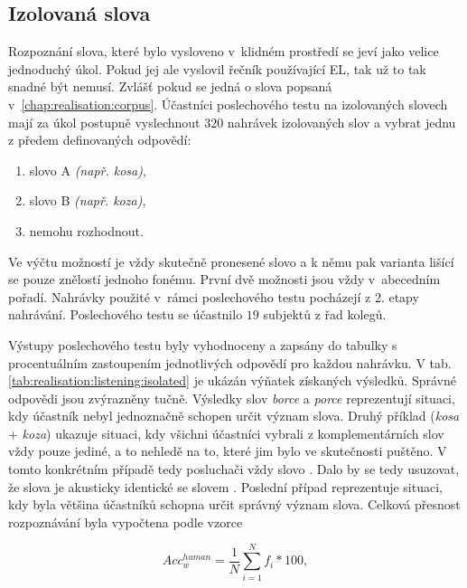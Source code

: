 \subsection{Izolovaná slova}
\label{chap:realisation:listening:isolated}

Rozpoznání slova, které bylo vysloveno v~klidném prostředí se jeví jako velice jednoduchý úkol.
Pokud jej ale vyslovil řečník používající EL, tak už to tak snadné být nemusí.
Zvlášť pokud se jedná o slova popsaná v~\ref{chap:realisation:corpus}.
Účastníci poslechového testu na izolovaných slovech mají za úkol postupně vyslechnout $320$ nahrávek izolovaných slov a vybrat jednu z předem definovaných odpovědí:

\begin{enumerate}[label=\alph*)]
  \item slovo A \textit{(např. kosa)},
  \item slovo B \textit{(např. koza)},
  \item nemohu rozhodnout.
\end{enumerate}

\noindent Ve výčtu možností je vždy skutečně pronesené slovo a k němu pak varianta lišící se pouze znělostí jednoho fonému. První dvě možnosti jsou vždy v~abecedním pořadí. Nahrávky použité v~rámci poslechového testu pocházejí z 2. etapy nahrávání. Poslechového testu se účastnilo $19$ subjektů z řad kolegů.

Výstupy poslechového testu byly vyhodnoceny a zapsány do tabulky s procentuálním zastoupením jednotlivých odpovědí pro každou nahrávku.
V tab. \ref{tab:realisation:listening:isolated} je ukázán výňatek získaných výsledků. Správné odpovědi jsou zvýrazněny tučně.
Výsledky slov \textit{borce} a \textit{porce} reprezentují situaci, kdy účastník nebyl jednoznačně schopen určit význam slova.
Druhý příklad (\textit{kosa} + \textit{koza}) ukazuje situaci, kdy všichni účastníci vybrali z komplementárních slov vždy pouze jediné, a to nehledě na to, které jim bylo ve skutečnosti puštěno.
V tomto konkrétním případě tedy posluchači vždy  slovo .
Dalo by se tedy usuzovat, že slova  je akusticky identické se slovem .
Poslední případ reprezentuje situaci, kdy byla většina účastníků schopna určit správný význam slova.
Celková přesnost rozpoznávání byla vypočtena podle vzorce

\begin{equation}
  Acc_w^{human} = \frac{1}{N} \sum_{i=1}^{N} f_i * 100,
  \label{eq:realisation:accuracy:human}
\end{equation}

